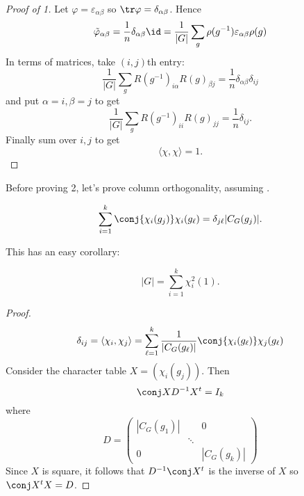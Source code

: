 \documentclass[a4paper]{article}
\theoremstyle{definition}
\begin{document}
\begin{proof}[Proof of  1]
Let \(\varphi = \varepsilon_{\alpha\beta}\) so \(\tr \varphi = \delta_{\alpha\beta}\). Hence
\[
  \tilde \varphi_{\alpha\beta}
  = \frac{1}{n} \delta_{\alpha\beta} \id
  = \frac{1}{|G|} \sum_g \rho(g^{-1}) \varepsilon_{\alpha\beta} \rho(g)
\]
In terms of matrices, take \((i, j)\)th entry:
\[
  \frac{1}{|G|} \sum_g R(g^{-1})_{i\alpha} R(g)_{\beta j} = \frac{1}{n} \delta_{\alpha\beta} \delta_{ij}
\]
and put \(\alpha = i, \beta = j\) to get
\[
  \frac{1}{|G|} \sum_g R(g^{-1})_{ii} R(g)_{jj} = \frac{1}{n} \delta_{ij}.
\]
Finally sum over \(i, j\) to get
\[
  \langle \chi, \chi \rangle = 1.
\]
\end{proof}

Before proving 2, let's prove column orthogonality, assuming .

\begin{corollary}
  \[
    \sum_{i = 1}^k \conj{\chi_i(g_j)} \chi_i(g_\ell) = \delta_{j\ell} |C_G(g_j)|.
  \]
\end{corollary}

This has an easy corollary:

\begin{theorem}
  \[
    |G| = \sum_{i = 1}^k \chi_i^2(1).
  \]
\end{theorem}

\begin{proof}
  \[
    \delta_{ij}
    = \langle \chi_i, \chi_j \rangle
    = \sum_{\ell = 1}^k \frac{1}{|C_G(g_\ell)|} \conj{\chi_i(g_\ell)} \chi_j(g_\ell)
  \]
  Consider the character table \(X = (\chi_i(g_j))\). Then
  \[
    \conj X D^{-1} X^t = I_k
  \]
  where
  \[
    D =
    \begin{pmatrix}
      |C_G(g_1)| & & 0 \\
      & \ddots \\
      0 & & |C_G(g_k)|
    \end{pmatrix}
  \]
  Since \(X\) is square, it follows that \(D^{-1} \conj X^t\) is the inverse of \(X\) so \(\conj X^t X = D\).
\end{proof}
\end{document}
